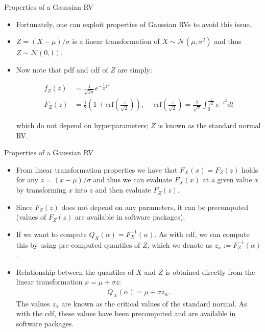 \documentclass[9pt]{beamer}
\begin{document}
%
\begin{frame}{Properties of a Gaussian RV}

\begin{itemize}
\setlength{\itemsep}{10pt}
\item Fortunately, one can exploit properties of Gaussian RVs to avoid this issue. 

\item $Z=(X-\mu)/\sigma$ is a linear transformation of $X\sim \mathcal{N}(\mu,\sigma^2)$ and thus $Z\sim \mathcal{N}(0,1)$. 

\item Now note that pdf and cdf of $Z$ are simply:
\begin{block}{}
\begin{align*}
f_Z(z)&=\frac{1}{\sqrt{2\pi}}e^{-\frac{1}{2}z^2}\\
F_Z\left(z\right)&=\frac{1}{2}\left(1+\textrm{erf}\left(\frac{z}{\sqrt{2}}\right)\right),\; \quad \textrm{erf}\left(\frac{z}{\sqrt{2}}\right)=\frac{2}{\sqrt{\pi}}\int_0^{\frac{z}{\sqrt{2}}}e^{-t^2}dt
\end{align*}
\end{block}
which do not depend on hyperparameters; $Z$ is known as the standard normal RV. 
\end{itemize}

\end{frame}


%
\begin{frame}{Properties of a Gaussian RV}

\begin{itemize}
\setlength{\itemsep}{10pt}
\item From linear transformation properties we have that $F_X(x)=F_Z(z)$ holds for any $z=(x-\mu)/\sigma$ and thus we can evaluate $F_X(x)$ at a given value $x$ by transforming $x$ into $z$ and then evaluate $F_Z(z)$. 

\item Since $F_Z(z)$ does not depend on any parameters, it can be precomputed (values of $F_Z(z)$ are available in software packages). 

\item If we want to compute $Q_X(\alpha)=F^{-1}_X(\alpha)$. As with cdf, we can compute this by using pre-computed quantiles of $Z$, which we denote as $z_\alpha:=F_Z^{-1}(\alpha)$. 

\item Relationship between the quantiles of $X$ and $Z$ is obtained directly from the linear transformation $x=\mu+\sigma z$:
\begin{align*}
Q_X(\alpha)=\mu+\sigma z_\alpha.
\end{align*}
The values $z_\alpha$ are known as the critical values of the standard normal. As with the cdf, these values have been precomputed and are available in software packages. 
\end{itemize}

\end{frame}
\end{document}
